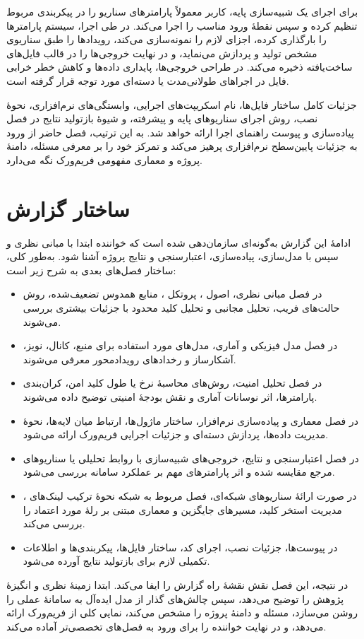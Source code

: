 برای اجرای یک شبیه‌سازی پایه، کاربر معمولاً پارامترهای سناریو را در پیکربندی مربوط تنظیم کرده و سپس نقطهٔ ورود مناسب را اجرا می‌کند. در طی اجرا، سیستم پارامترها را بارگذاری کرده، اجزای لازم را نمونه‌سازی می‌کند، رویدادها را طبق سناریوی مشخص تولید و پردازش می‌نماید، و در نهایت خروجی‌ها را در قالب فایل‌های ساخت‌یافته ذخیره می‌کند. در طراحی خروجی‌ها، پایداری داده‌ها و کاهش خطر خرابی فایل در اجراهای طولانی‌مدت یا دسته‌ای مورد توجه قرار گرفته است.

جزئیات کامل ساختار فایل‌ها، نام اسکریپت‌های اجرایی، وابستگی‌های نرم‌افزاری، نحوهٔ نصب، روش اجرای سناریوهای پایه و پیشرفته، و شیوهٔ بازتولید نتایج در فصل پیاده‌سازی و پیوست راهنمای اجرا ارائه خواهد شد. به این ترتیب، فصل حاضر از ورود به جزئیات پایین‌سطح نرم‌افزاری پرهیز می‌کند و تمرکز خود را بر معرفی مسئله، دامنهٔ پروژه و معماری مفهومی فریم‌ورک نگه می‌دارد.

\section{ساختار گزارش}

ادامهٔ این گزارش به‌گونه‌ای سازمان‌دهی شده است که خواننده ابتدا با مبانی نظری و سپس با مدل‌سازی، پیاده‌سازی، اعتبارسنجی و نتایج پروژه آشنا شود. به‌طور کلی، ساختار فصل‌های بعدی به شرح زیر است:

\begin{itemize}
	\item در فصل مبانی نظری، اصول ، پروتکل ، منابع همدوس تضعیف‌شده، روش حالت‌های فریب، تحلیل مجانبی و تحلیل کلید محدود با جزئیات بیشتری بررسی می‌شوند.
	
	\item در فصل مدل فیزیکی و آماری، مدل‌های مورد استفاده برای منبع، کانال، نویز، آشکارساز و رخدادهای رویدادمحور معرفی می‌شوند.
	
	\item در فصل تحلیل امنیت، روش‌های محاسبهٔ نرخ یا طول کلید امن، کران‌بندی پارامترها، اثر نوسانات آماری و نقش بودجهٔ امنیتی توضیح داده می‌شوند.
	
	\item در فصل معماری و پیاده‌سازی نرم‌افزار، ساختار ماژول‌ها، ارتباط میان لایه‌ها، نحوهٔ مدیریت داده‌ها، پردازش دسته‌ای و جزئیات اجرایی فریم‌ورک ارائه می‌شود.
	
	\item در فصل اعتبارسنجی و نتایج، خروجی‌های شبیه‌سازی با روابط تحلیلی یا سناریوهای مرجع مقایسه شده و اثر پارامترهای مهم بر عملکرد سامانه بررسی می‌شود.
	
	\item در صورت ارائهٔ سناریوهای شبکه‌ای، فصل مربوط به شبکه نحوهٔ ترکیب لینک‌های ، مدیریت استخر کلید، مسیرهای جایگزین و معماری مبتنی بر رلهٔ مورد اعتماد را بررسی می‌کند.
	
	\item در پیوست‌ها، جزئیات نصب، اجرای کد، ساختار فایل‌ها، پیکربندی‌ها و اطلاعات تکمیلی لازم برای بازتولید نتایج آورده می‌شود.
\end{itemize}

در نتیجه، این فصل نقش نقشهٔ راه گزارش را ایفا می‌کند. ابتدا زمینهٔ نظری و انگیزهٔ پژوهش را توضیح می‌دهد، سپس چالش‌های گذار از مدل ایده‌آل به سامانهٔ عملی را روشن می‌سازد، مسئله و دامنهٔ پروژه را مشخص می‌کند، نمایی کلی از فریم‌ورک ارائه می‌دهد، و در نهایت خواننده را برای ورود به فصل‌های تخصصی‌تر آماده می‌کند.
